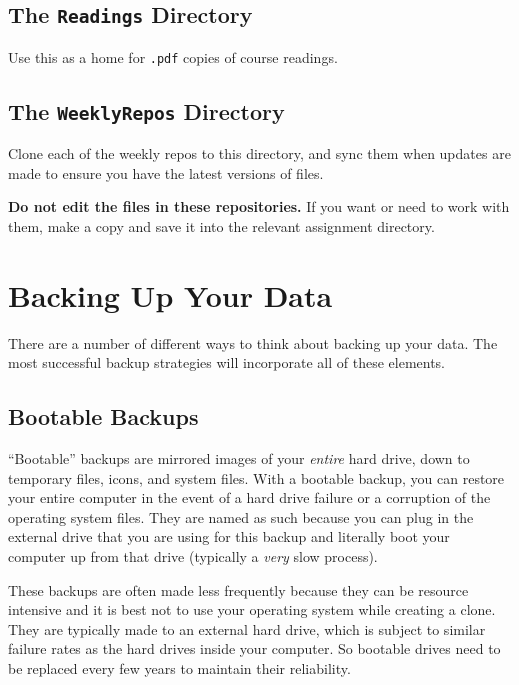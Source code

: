\documentclass[]{book}
\theoremstyle{definition}
\theoremstyle{definition}
\theoremstyle{remark}
\begin{document}
\subsection{\texorpdfstring{The \texttt{Readings}
Directory}{The Readings Directory}}\label{the-readings-directory}

Use this as a home for \texttt{.pdf} copies of course readings.

\subsection{\texorpdfstring{The \texttt{WeeklyRepos}
Directory}{The WeeklyRepos Directory}}\label{the-weeklyrepos-directory}

Clone each of the weekly repos to this directory, and sync them when
updates are made to ensure you have the latest versions of files.

\textbf{Do not edit the files in these repositories.} If you want or
need to work with them, make a copy and save it into the relevant
assignment directory.

\section{Backing Up Your Data}\label{backing-up-your-data}

There are a number of different ways to think about backing up your
data. The most successful backup strategies will incorporate all of
these elements.

\subsection{Bootable Backups}\label{bootable-backups}

``Bootable'' backups are mirrored images of your \emph{entire} hard
drive, down to temporary files, icons, and system files. With a bootable
backup, you can restore your entire computer in the event of a hard
drive failure or a corruption of the operating system files. They are
named as such because you can plug in the external drive that you are
using for this backup and literally boot your computer up from that
drive (typically a \emph{very} slow process).

These backups are often made less frequently because they can be
resource intensive and it is best not to use your operating system while
creating a clone. They are typically made to an external hard drive,
which is subject to similar failure rates as the hard drives inside your
computer. So bootable drives need to be replaced every few years to
maintain their reliability.
\end{document}
